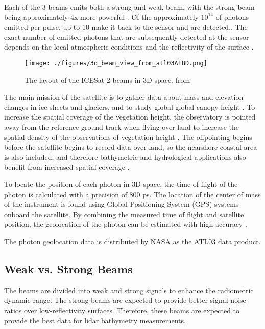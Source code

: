 Each of the 3 beams emits both a strong and weak beam, with the strong beam being approximately 4x more powerful \parencite{Neumann2019d}. Of the approximately \(10^{14}\) of photons emitted per pulse, up to  10 make it back to the sensor and are detected.\parencite{Neumann2019d}. The exact number of emitted photons that are subsequently detected at the sensor depends on the local atmospheric conditions and the reflectivity of the surface \parencite{Neumann2019e}.
\begin{figure}[htbp]
      \centering
      \texttt{[image: ./figures/3d\_beam\_view\_from\_atl03ATBD.png]}
      \caption{The layout of the ICESat-2 beams in 3D space. from \cite{Neumann2019d}}
      \label{3d-beams}
\end{figure}


The main mission of the satellite is to gather data about mass and elevation changes in ice sheets and glaciers, and to study global global canopy height \parencite{Markus2017}. To increase the spatial coverage of the vegetation height, the observatory is pointed away from the reference ground track when flying over land to increase the spatial density of the observations of vegetation height \parencite{Markus2017}. The offpointing begins before the satellite begins to record data over land, so the nearshore coastal area is also included, and therefore bathymetric and hydrological applications also benefit from increased spatial coverage \parencite{Magruder2021}.

To locate the position of each photon in 3D space, the time of flight of the photon is calculated with a precision of 800 ps\parencite{Neumann2019d}. The location of the center of mass of the instrument is found using Global Positioning System (GPS) systems onboard the satellite. By combining the measured time of flight and satellite position, the geolocation of the photon can be estimated with high accuracy \parencite{Neumann2019d}.

The photon geolocation data is distributed by NASA as the ATL03 data product.

\subsection{Weak vs. Strong Beams}

The beams are divided into weak and strong signals to enhance the radiometric dynamic range. The strong beams are expected to provide better signal-noise ratios over low-reflectivity surfaces.\parencite{Neumann2019d} Therefore, these beams are expected to provide the best data for lidar bathymetry measurements.

